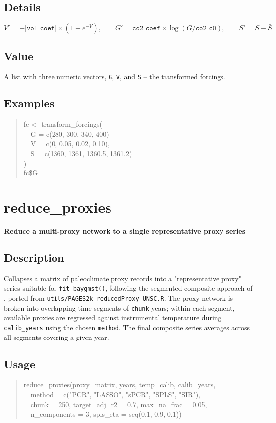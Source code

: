 \documentclass[10pt]{article}
\newcommand{\rdtopic}[1]{\clearpage\section{#1}}
\newcommand{\rdsub}[1]{\subsection*{#1}}
\newenvironment{rdusage}{\begin{quote}\ttfamily\small}{\end{quote}}
\newenvironment{rdcode}{\begin{quote}\ttfamily\small}{\end{quote}}
\begin{document}
\rdsub{Details}
\[ V' = -|\texttt{vol\_coef}| \times (1 - e^{-V}), \qquad
   G' = \texttt{co2\_coef} \times \log(G / \texttt{co2\_c0}), \qquad
   S' = S - \bar{S} \]

\rdsub{Value}
A list with three numeric vectors, \texttt{G}, \texttt{V}, and \texttt{S} --
the transformed forcings.

\rdsub{Examples}
\begin{rdcode}
fc <- transform\_forcings(\\
\ \ G = c(280, 300, 340, 400),\\
\ \ V = c(0, 0.05, 0.02, 0.10),\\
\ \ S = c(1360, 1361, 1360.5, 1361.2)\\
)\\
fc\$G
\end{rdcode}

\rdtopic{reduce\_proxies}
\textbf{Reduce a multi-proxy network to a single representative proxy series}

\rdsub{Description}
Collapses a matrix of paleoclimate proxy records into a "representative
proxy" series suitable for \texttt{fit\_baygmst()}, following the
segmented-composite approach of \citet{Barboza2019}, ported from
\texttt{utils/PAGES2k\_reducedProxy\_UNSC.R}. The proxy network is broken
into overlapping time segments of \texttt{chunk} years; within each
segment, available proxies are regressed against instrumental temperature
during \texttt{calib\_years} using the chosen \texttt{method}. The final
composite series averages across all segments covering a given year.

\rdsub{Usage}
\begin{rdusage}
reduce\_proxies(proxy\_matrix, years, temp\_calib, calib\_years,\\
\ \ method = c("PCR", "LASSO", "sPCR", "SPLS", "SIR"),\\
\ \ chunk = 250, target\_adj\_r2 = 0.7, max\_na\_frac = 0.05,\\
\ \ n\_components = 3, spls\_eta = seq(0.1, 0.9, 0.1))
\end{rdusage}
\end{document}
